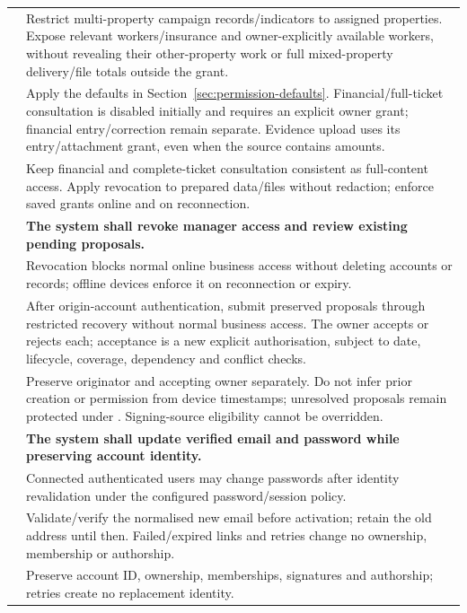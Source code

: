 {\begin{longtable}{L{0.18}L{0.82}}
\label{ac:007:b} & Restrict multi-property campaign records/indicators to assigned properties. Expose relevant workers/insurance and owner-explicitly available workers, without revealing their other-property work or full mixed-property delivery/file totals outside the grant.\\
\label{ac:007:c} & Apply the defaults in Section~\ref{sec:permission-defaults}. Financial/full-ticket consultation is disabled initially and requires an explicit owner grant; financial entry/correction remain separate. Evidence upload uses its entry/attachment grant, even when the source contains amounts.\\
\label{ac:007:d} & Keep financial and complete-ticket consultation consistent as full-content access. Apply revocation to prepared data/files without redaction; enforce saved grants online and on reconnection.\\
\midrule
{}
\label{fr:008}\textbf{} & \textbf{The system shall revoke manager access and review existing pending proposals.}\\*
\label{ac:008:a} & Revocation blocks normal online business access without deleting accounts or records; offline devices enforce it on reconnection or expiry.\\
\label{ac:008:b} & After origin-account authentication, submit preserved proposals through restricted recovery without normal business access. The owner accepts or rejects each; acceptance is a new explicit authorisation, subject to date, lifecycle, coverage, dependency and conflict checks.\\
\label{ac:008:c} & Preserve originator and accepting owner separately. Do not infer prior creation or permission from device timestamps; unresolved proposals remain protected under . Signing-source eligibility cannot be overridden.\\
\midrule
{}
\label{fr:064}\textbf{} & \textbf{The system shall update verified email and password while preserving account identity.}\\*
\label{ac:064:a} & Connected authenticated users may change passwords after identity revalidation under the configured password/session policy.\\
\label{ac:064:b} & Validate/verify the normalised new email before activation; retain the old address until then. Failed/expired links and retries change no ownership, membership or authorship.\\
\label{ac:064:c} & Preserve account ID, ownership, memberships, signatures and authorship; retries create no replacement identity.\\
\end{longtable}
}
